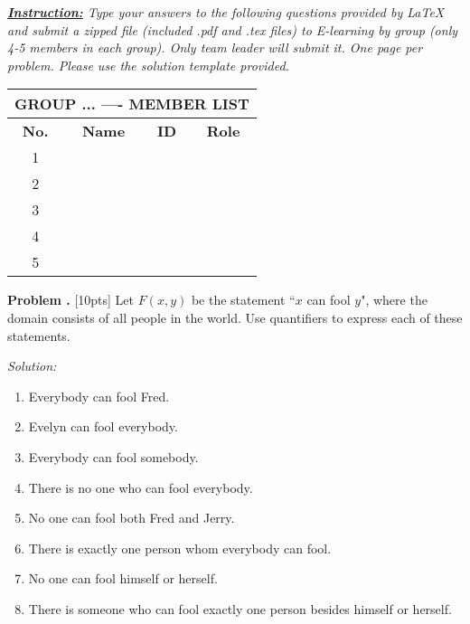 \documentclass[10pt]{article}
\newcounter{problem}
\newcommand{\problem}{\textbf{\refstepcounter{problem}Problem \theproblem.} }
\begin{document}
\pagestyle{fancyplain}
\textit{\textbf{\underline{Instruction:}} Type your answers to the following questions provided by LaTeX and submit a zipped file (included .pdf and .tex files) to E-learning by group (only 4-5 members in each group). Only team leader will submit it. One page per problem. Please use the solution template provided.}


\begin{center}
    \begin{tabular}{|c|c|c|c|}
        \hline 
        \multicolumn{4}{|c|}{\textbf{GROUP ... ---- MEMBER LIST}} \\ 
        \hline 
        \textbf{No.} &\qquad\qquad \textbf{Name}\qquad\qquad\qquad & \qquad\textbf{ID}\qquad\qquad & \qquad\textbf{Role}\qquad\qquad \\ 
        \hline 
        1 &  &  &  \\ 
        \hline 
        2 &  &  &  \\ 
        \hline 
        3 &  &  &  \\ 
        \hline 
        4 &  &  &  \\ 
        \hline 
        5 &  &  &  \\ 
        \hline 
    \end{tabular} 
\end{center}



\clearpage
\problem [10pts] Let $F(x, y)$ be the statement ``$x$ can fool $y$", where the domain consists of all people in the world. Use quantifiers to express each of these statements.

\bigbreak
\textit{Solution:}

\begin{enumerate}
    \item Everybody can fool Fred.
    
    \item Evelyn can fool everybody.

    \item Everybody can fool somebody.

    \item There is no one who can fool everybody.

    \item No one can fool both Fred and Jerry.

    \item There is exactly one person whom everybody can fool.

    \item No one can fool himself or herself.

    \item There is someone who can fool exactly one person besides himself or herself.


\end{enumerate}
\end{document}
